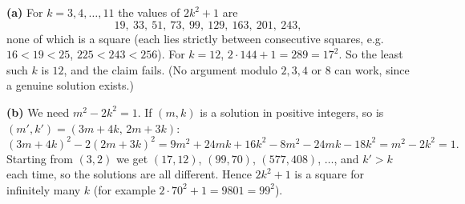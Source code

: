 \textbf{(a)} For $k=3,4,\dots,11$ the values of $2k^2+1$ are
\[
19,\ 33,\ 51,\ 73,\ 99,\ 129,\ 163,\ 201,\ 243,
\]
none of which is a square (each lies strictly between consecutive squares, e.g. $16<19<25$, $225<243<256$). For $k=12$, $2\cdot144+1=289=17^2$. So the least such $k$ is $\boxed{12}$, and the claim fails. (No argument modulo $2,3,4$ or $8$ can work, since a genuine solution exists.)

\textbf{(b)} We need $m^2-2k^2=1$. If $(m,k)$ is a solution in positive integers, so is $(m',k')=(3m+4k,\,2m+3k)$:
\[
(3m+4k)^2-2(2m+3k)^2=9m^2+24mk+16k^2-8m^2-24mk-18k^2=m^2-2k^2=1 .
\]
Starting from $(3,2)$ we get $(17,12)$, $(99,70)$, $(577,408)$, $\dots$, and $k'>k$ each time, so the solutions are all different. Hence $2k^2+1$ is a square for infinitely many $k$ (for example $2\cdot70^2+1=9801=99^2$).
